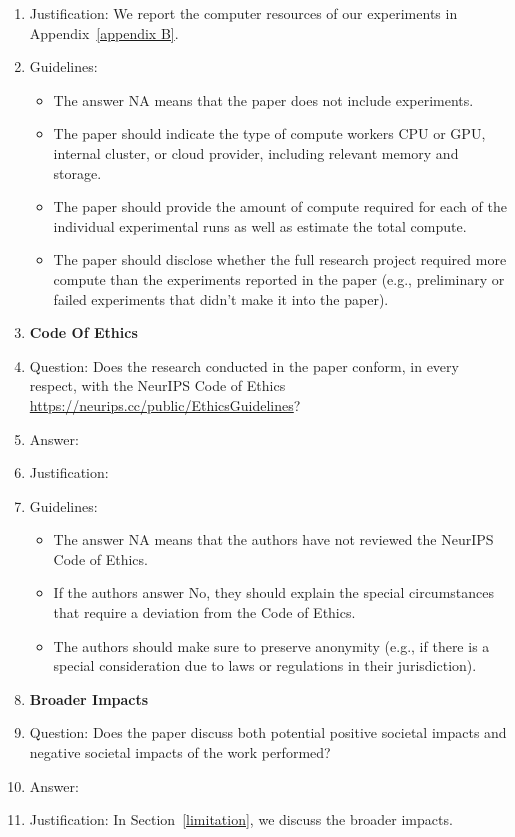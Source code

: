 \documentclass{article}
\begin{document}
\begin{enumerate}
    \item[] Justification: We report the computer resources of our experiments in Appendix~\ref{appendix B}.
    \item[] Guidelines:
    \begin{itemize}
        \item The answer NA means that the paper does not include experiments.
        \item The paper should indicate the type of compute workers CPU or GPU, internal cluster, or cloud provider, including relevant memory and storage.
        \item The paper should provide the amount of compute required for each of the individual experimental runs as well as estimate the total compute.
        \item The paper should disclose whether the full research project required more compute than the experiments reported in the paper (e.g., preliminary or failed experiments that didn't make it into the paper).
    \end{itemize}
\item {\bf Code Of Ethics}
    \item[] Question: Does the research conducted in the paper conform, in every respect, with the NeurIPS Code of Ethics \url{https://neurips.cc/public/EthicsGuidelines}?
    \item[] Answer: \answerYes{}
    \item[] Justification: \justificationTODO{}
    \item[] Guidelines:
    \begin{itemize}
        \item The answer NA means that the authors have not reviewed the NeurIPS Code of Ethics.
        \item If the authors answer No, they should explain the special circumstances that require a deviation from the Code of Ethics.
        \item The authors should make sure to preserve anonymity (e.g., if there is a special consideration due to laws or regulations in their jurisdiction).
    \end{itemize}
\item {\bf Broader Impacts}
    \item[] Question: Does the paper discuss both potential positive societal impacts and negative societal impacts of the work performed?
    \item[] Answer: \answerYes{}
    \item[] Justification: In Section~\ref{limitation}, we discuss the broader impacts.

\end{enumerate}
\end{document}

